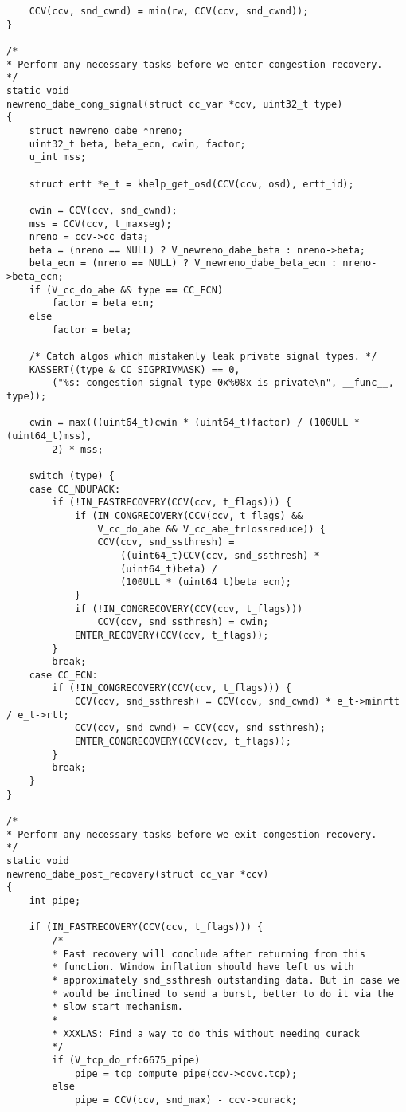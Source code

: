 \begin{code}
\begin{verbatim}
    CCV(ccv, snd_cwnd) = min(rw, CCV(ccv, snd_cwnd));
}

/*
* Perform any necessary tasks before we enter congestion recovery.
*/
static void
newreno_dabe_cong_signal(struct cc_var *ccv, uint32_t type)
{
    struct newreno_dabe *nreno;
    uint32_t beta, beta_ecn, cwin, factor;
    u_int mss;

    struct ertt *e_t = khelp_get_osd(CCV(ccv, osd), ertt_id);

    cwin = CCV(ccv, snd_cwnd);
    mss = CCV(ccv, t_maxseg);
    nreno = ccv->cc_data;
    beta = (nreno == NULL) ? V_newreno_dabe_beta : nreno->beta;
    beta_ecn = (nreno == NULL) ? V_newreno_dabe_beta_ecn : nreno->beta_ecn;
    if (V_cc_do_abe && type == CC_ECN)
        factor = beta_ecn;
    else
        factor = beta;

    /* Catch algos which mistakenly leak private signal types. */
    KASSERT((type & CC_SIGPRIVMASK) == 0,
        ("%s: congestion signal type 0x%08x is private\n", __func__, type));

    cwin = max(((uint64_t)cwin * (uint64_t)factor) / (100ULL * (uint64_t)mss),
        2) * mss;

    switch (type) {
    case CC_NDUPACK:
        if (!IN_FASTRECOVERY(CCV(ccv, t_flags))) {
            if (IN_CONGRECOVERY(CCV(ccv, t_flags) &&
                V_cc_do_abe && V_cc_abe_frlossreduce)) {
                CCV(ccv, snd_ssthresh) =
                    ((uint64_t)CCV(ccv, snd_ssthresh) *
                    (uint64_t)beta) /
                    (100ULL * (uint64_t)beta_ecn);
            }
            if (!IN_CONGRECOVERY(CCV(ccv, t_flags)))
                CCV(ccv, snd_ssthresh) = cwin;
            ENTER_RECOVERY(CCV(ccv, t_flags));
        }
        break;
    case CC_ECN:
        if (!IN_CONGRECOVERY(CCV(ccv, t_flags))) {
            CCV(ccv, snd_ssthresh) = CCV(ccv, snd_cwnd) * e_t->minrtt / e_t->rtt;
            CCV(ccv, snd_cwnd) = CCV(ccv, snd_ssthresh);
            ENTER_CONGRECOVERY(CCV(ccv, t_flags));
        }
        break;
    }
}

/*
* Perform any necessary tasks before we exit congestion recovery.
*/
static void
newreno_dabe_post_recovery(struct cc_var *ccv)
{
    int pipe;

    if (IN_FASTRECOVERY(CCV(ccv, t_flags))) {
        /*
        * Fast recovery will conclude after returning from this
        * function. Window inflation should have left us with
        * approximately snd_ssthresh outstanding data. But in case we
        * would be inclined to send a burst, better to do it via the
        * slow start mechanism.
        *
        * XXXLAS: Find a way to do this without needing curack
        */
        if (V_tcp_do_rfc6675_pipe)
            pipe = tcp_compute_pipe(ccv->ccvc.tcp);
        else
            pipe = CCV(ccv, snd_max) - ccv->curack;


\end{verbatim}
\end{code}
